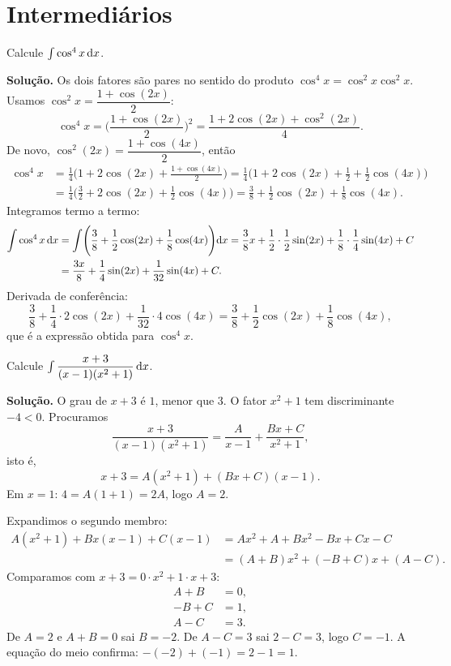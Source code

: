 \documentclass[11pt,a4paper]{article}
\begin{document}
\section{Intermediários}

\begin{exercicio}[Intermediário --- I1]
Calcule \(\int\cos^{4}x\,\mathrm{d} x\).
\end{exercicio}

\noindent\textbf{Solução.}
Os dois fatores são pares no sentido do produto \(\cos^{4}x=\cos^{2}x\cos^{2}x\). Usamos \(\cos^{2}x=\dfrac{1+\cos(2x)}{2}\):
\[
\cos^{4}x
=\Biggl(\frac{1+\cos(2x)}{2}\Biggr)^{2}
=\frac{1+2\cos(2x)+\cos^{2}(2x)}{4}.
\]
De novo, \(\cos^{2}(2x)=\dfrac{1+\cos(4x)}{2}\), então
\begin{align*}
\cos^{4}x
&=\frac{1}{4}\Biggl(1+2\cos(2x)+\frac{1+\cos(4x)}{2}\Biggr)
=\frac{1}{4}\Biggl(1+2\cos(2x)+\frac12+\frac12\cos(4x)\Biggr)\\
&=\frac{1}{4}\Biggl(\frac{3}{2}+2\cos(2x)+\frac12\cos(4x)\Biggr)
=\frac{3}{8}+\frac12\cos(2x)+\frac18\cos(4x).
\end{align*}
Integramos termo a termo:
\begin{align*}
\int\cos^{4}x\,\mathrm{d} x
&=\int\Biggl(\frac38+\frac12\cos(2x)+\frac18\cos(4x)\Biggr)\mathrm{d} x
=\frac38 x+\frac12\cdot\frac12\sin(2x)+\frac18\cdot\frac14\sin(4x)+C\\
&=\frac{3x}{8}+\frac14\sin(2x)+\frac{1}{32}\sin(4x)+C.
\end{align*}
Derivada de conferência:
\[
\frac38+\frac14\cdot 2\cos(2x)+\frac{1}{32}\cdot 4\cos(4x)
=\frac38+\frac12\cos(2x)+\frac18\cos(4x),
\]
que é a expressão obtida para \(\cos^{4}x\).

\begin{exercicio}[Intermediário --- I2]
Calcule \(\int\dfrac{x+3}{(x-1)(x^{2}+1)}\,\mathrm{d} x\).
\end{exercicio}

\noindent\textbf{Solução.}
O grau de \(x+3\) é \(1\), menor que \(3\). O fator \(x^{2}+1\) tem discriminante \(-4<0\). Procuramos
\[
\frac{x+3}{(x-1)(x^{2}+1)}
=\frac{A}{x-1}+\frac{Bx+C}{x^{2}+1},
\]
isto é,
\[
x+3=A(x^{2}+1)+(Bx+C)(x-1).
\]
Em \(x=1\): \(4=A(1+1)=2A\), logo \(A=2\).

Expandimos o segundo membro:
\begin{align*}
A(x^{2}+1)+Bx(x-1)+C(x-1)
&=Ax^{2}+A+Bx^{2}-Bx+Cx-C\\
&=(A+B)x^{2}+(-B+C)x+(A-C).
\end{align*}
Comparamos com \(x+3=0\cdot x^{2}+1\cdot x+3\):
\begin{align*}
A+B&=0,\\
-B+C&=1,\\
A-C&=3.
\end{align*}
De \(A=2\) e \(A+B=0\) sai \(B=-2\). De \(A-C=3\) sai \(2-C=3\), logo \(C=-1\). A equação do meio confirma: \(-(-2)+(-1)=2-1=1\).
\end{document}
